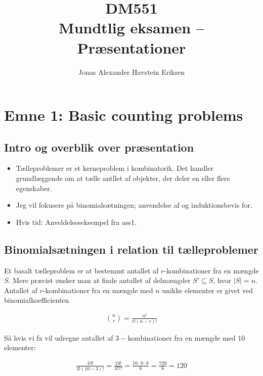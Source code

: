 \documentclass[12pt]{article}
\begin{document}
\title{DM551 \\ Mundtlig eksamen -- Præsentationer}
\author{Jonas Alexander Havstein Eriksen}
\date{\vspace{-5ex}}

\maketitle

\tableofcontents

\newpage 

\section{Emne 1: Basic counting problems}

\subsection*{Intro og overblik over præsentation}
\begin{itemize}
    \item Tælleproblemer er et kerneproblem i kombinatorik. Det handler grundlæggende om at tælle antllet af objekter, der deler en eller flere egenskaber. 
    \item Jeg vil fokusere på binomialsætningen; anvendelse af og induktionsbevis for. 
    \item Hvis tid: Anveldelseseksempel fra ass1.
\end{itemize}

\subsection*{Binomialsætningen i relation til tælleproblemer} 

Et basalt tælleproblem er at bestemmt antallet af $r$-kombinationer fra en mængde $S$. Mere præcist ønsker man at finde antallet af delmængder $S' \subseteq  S$, hvor $|S|=n$. Antallet af $r$-kombinationer fra en mængde med $n$ unikke elementer er givet ved binomialkoefficienten

\begin{align*}
    \binom{n}{r} = \frac{n!}{r!(n-r)!}
\end{align*}

Så hvis vi fx vil udregne antallet af $3-$kombinationer fra en mængde med $10$ elementer:

\begin{align*}
    \frac{10!}{3!(10-3)!}=\frac{10!}{3!7!} = \frac{10 \cdot 9 \cdot 8}{6} = \frac{720}{6}=120
\end{align*}
\end{document}

